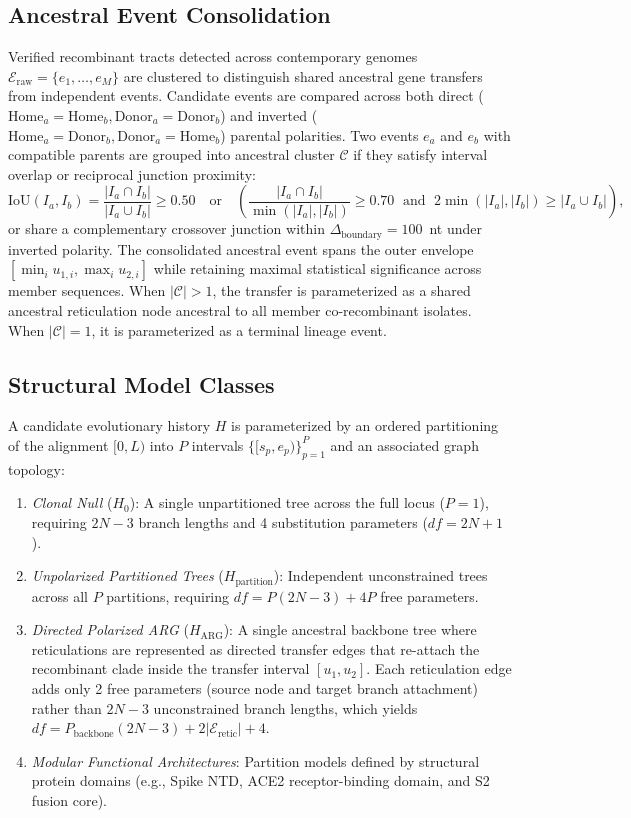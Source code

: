 \subsection{Ancestral Event Consolidation}
Verified recombinant tracts detected across contemporary genomes $\mathcal{E}_{\mathrm{raw}} = \{e_1, \dots, e_M\}$ are clustered to distinguish shared ancestral gene transfers from independent events.
Candidate events are compared across both direct ($\mathrm{Home}_a = \mathrm{Home}_b, \mathrm{Donor}_a = \mathrm{Donor}_b$) and inverted ($\mathrm{Home}_a = \mathrm{Donor}_b, \mathrm{Donor}_a = \mathrm{Home}_b$) parental polarities.
Two events $e_a$ and $e_b$ with compatible parents are grouped into ancestral cluster $\mathcal{C}$ if they satisfy interval overlap or reciprocal junction proximity:
\begin{equation}
\mathrm{IoU}(I_a, I_b) = \frac{|I_a \cap I_b|}{|I_a \cup I_b|} \ge 0.50 \quad \text{or} \quad \left(\frac{|I_a \cap I_b|}{\min(|I_a|, |I_b|)} \ge 0.70 \;\text{ and }\; 2\min(|I_a|, |I_b|) \ge |I_a \cup I_b|\right),
\end{equation}
or share a complementary crossover junction within $\Delta_{\mathrm{boundary}} = 100$~nt under inverted polarity.
The consolidated ancestral event spans the outer envelope $[\min_i u_{1,i}, \max_i u_{2,i}]$ while retaining maximal statistical significance across member sequences.
When $|\mathcal{C}| > 1$, the transfer is parameterized as a shared ancestral reticulation node ancestral to all member co-recombinant isolates.
When $|\mathcal{C}| = 1$, it is parameterized as a terminal lineage event.

\subsection{Structural Model Classes}
A candidate evolutionary history $H$ is parameterized by an ordered partitioning of the alignment $[0, L)$ into $P$ intervals $\{[s_p, e_p)\}_{p=1}^P$ and an associated graph topology:
\begin{enumerate}
    \item \emph{Clonal Null} ($H_0$): A single unpartitioned tree across the full locus ($P = 1$), requiring $2N - 3$ branch lengths and 4 substitution parameters ($df = 2N + 1$).
    \item \emph{Unpolarized Partitioned Trees} ($H_{\mathrm{partition}}$): Independent unconstrained trees across all $P$ partitions, requiring $df = P(2N - 3) + 4P$ free parameters.
    \item \emph{Directed Polarized ARG} ($H_{\mathrm{ARG}}$): A single ancestral backbone tree where reticulations are represented as directed transfer edges that re-attach the recombinant clade inside the transfer interval $[u_1, u_2]$. Each reticulation edge adds only 2 free parameters (source node and target branch attachment) rather than $2N - 3$ unconstrained branch lengths, which yields $df = P_{\mathrm{backbone}}(2N - 3) + 2|\mathcal{E}_{\mathrm{retic}}| + 4$.
    \item \emph{Modular Functional Architectures}: Partition models defined by structural protein domains (e.g., Spike NTD, ACE2 receptor-binding domain, and S2 fusion core).
\end{enumerate}

